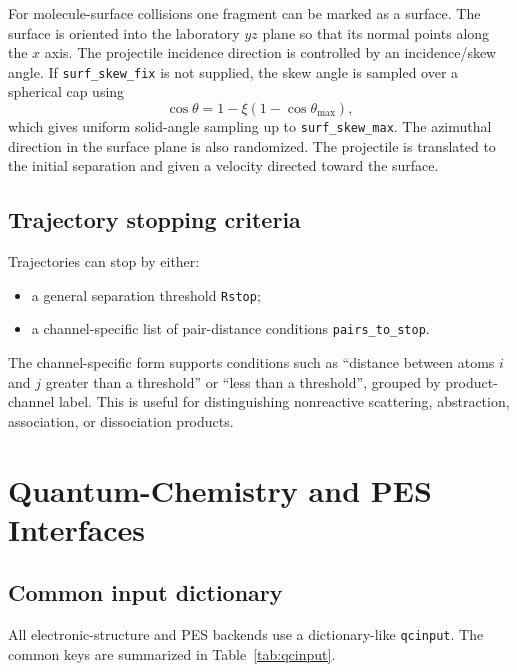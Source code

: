 \documentclass[11pt]{article}
\begin{document}
For molecule-surface collisions one fragment can be marked as a surface.  The surface is oriented into the laboratory $yz$ plane so that its normal points along the $x$ axis.  The projectile incidence direction is controlled by an incidence/skew angle.  If \texttt{surf\_skew\_fix} is not supplied, the skew angle is sampled over a spherical cap using
\begin{equation}
  \cos\theta = 1-\xi\left(1-\cos\theta_{\max}\right),
\end{equation}
which gives uniform solid-angle sampling up to \texttt{surf\_skew\_max}.  The azimuthal direction in the surface plane is also randomized.  The projectile is translated to the initial separation and given a velocity directed toward the surface.

\subsection{Trajectory stopping criteria}

Trajectories can stop by either:
\begin{itemize}
  \item a general separation threshold \texttt{Rstop};
  \item a channel-specific list of pair-distance conditions \texttt{pairs\_to\_stop}.
\end{itemize}
The channel-specific form supports conditions such as ``distance between atoms $i$ and $j$ greater than a threshold'' or ``less than a threshold'', grouped by product-channel label.  This is useful for distinguishing nonreactive scattering, abstraction, association, or dissociation products.

\section{Quantum-Chemistry and PES Interfaces}

\subsection{Common input dictionary}

All electronic-structure and PES backends use a dictionary-like \texttt{qcinput}.  The common keys are summarized in Table~\ref{tab:qcinput}.
\end{document}
